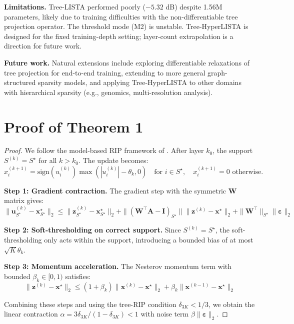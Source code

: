 \documentclass{article}
\begin{document}
\textbf{Limitations.} Tree-LISTA performed poorly ($-5.32$ dB) despite 1.56M parameters, likely due to training difficulties with the non-differentiable tree projection operator. The threshold mode (M2) is unstable. Tree-HyperLISTA is designed for the fixed training-depth setting; layer-count extrapolation is a direction for future work.

\textbf{Future work.} Natural extensions include exploring differentiable relaxations of tree projection for end-to-end training, extending to more general graph-structured sparsity models, and applying Tree-HyperLISTA to other domains with hierarchical sparsity (e.g., genomics, multi-resolution analysis).

\appendix
\section{Proof of Theorem 1}

\begin{proof}
We follow the model-based RIP framework of \cite{baraniuk2010model}. After layer $k_0$, the support $S^{(k)} = S^\star$ for all $k > k_0$. The update becomes:
\[
x_i^{(k+1)} = \mathrm{sign}(u_i^{(k)}) \max(|u_i^{(k)}| - \theta_k, 0) \quad \text{for } i \in S^\star, \quad x_i^{(k+1)} = 0 \text{ otherwise.}
\]

\textbf{Step 1: Gradient contraction.} The gradient step with the symmetric $\mathbf{W}$ matrix gives:
\[
\|\mathbf{u}^{(k)}_{S^\star} - \mathbf{x}^\star_{S^\star}\|_2 \leq \|\mathbf{z}^{(k)}_{S^\star} - \mathbf{x}^\star_{S^\star}\|_2 + \|(\mathbf{W}^\top\mathbf{A} - \mathbf{I})_{S^\star}\| \|\mathbf{z}^{(k)} - \mathbf{x}^\star\|_2 + \|\mathbf{W}^\top\|_{S^\star} \|\boldsymbol{\varepsilon}\|_2
\]

\textbf{Step 2: Soft-thresholding on correct support.} Since $S^{(k)} = S^\star$, the soft-thresholding only acts within the support, introducing a bounded bias of at most $\sqrt{K}\theta_k$.

\textbf{Step 3: Momentum acceleration.} The Nesterov momentum term with bounded $\beta_k \in [0, 1)$ satisfies:
\[
\|\mathbf{z}^{(k)} - \mathbf{x}^\star\|_2 \leq (1 + \beta_k)\|\mathbf{x}^{(k)} - \mathbf{x}^\star\|_2 + \beta_k \|\mathbf{x}^{(k-1)} - \mathbf{x}^\star\|_2
\]

Combining these steps and using the tree-RIP condition $\delta_{3K} < 1/3$, we obtain the linear contraction $\alpha = 3\delta_{3K}/(1 - \delta_{3K}) < 1$ with noise term $\beta \|\boldsymbol{\varepsilon}\|_2$.
\end{proof}
\end{document}
